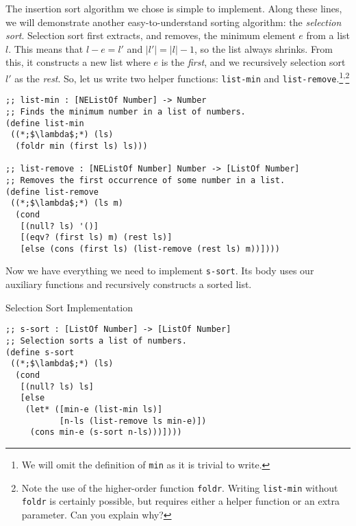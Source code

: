 The insertion sort algorithm we chose is simple to implement. Along these lines, we will demonstrate another easy-to-understand sorting algorithm: the \textit{selection sort}. Selection sort first extracts, and removes, the minimum element $e$ from a list $l$. This means that $l-e=l'$ and $|l'|=|l|-1$, so the list always shrinks. From this, it constructs a new list where $e$ is the \textit{first}, and we recursively selection sort $l'$ as the \textit{rest}. So, let us write two helper functions: \texttt{list-min} and \texttt{list-remove}.\footnote{We will omit the definition of \texttt{min} as it is trivial to write.}\textsuperscript{,}\footnote{Note the use of the higher-order function \texttt{foldr}. Writing \texttt{list-min} without \texttt{foldr} is certainly possible, but requires either a helper function or an extra parameter. Can you explain why?}

\begin{cl}[]{}\begin{lstlisting}[language=MyScheme]
;; list-min : [NEListOf Number] -> Number
;; Finds the minimum number in a list of numbers.
(define list-min
 ((*;$\lambda$;*) (ls)
  (foldr min (first ls) ls)))

;; list-remove : [NEListOf Number] Number -> [ListOf Number]
;; Removes the first occurrence of some number in a list.
(define list-remove
 ((*;$\lambda$;*) (ls m)
  (cond
   [(null? ls) '()]
   [(eqv? (first ls) m) (rest ls)]
   [else (cons (first ls) (list-remove (rest ls) m))])))
\end{lstlisting}\end{cl}

Now we have everything we need to implement \texttt{s-sort}. Its body uses our auxiliary functions and recursively constructs a sorted list.

\begin{cl}[]{Selection Sort Implementation}\begin{lstlisting}[language=MyScheme]
;; s-sort : [ListOf Number] -> [ListOf Number]
;; Selection sorts a list of numbers.
(define s-sort
 ((*;$\lambda$;*) (ls)
  (cond
   [(null? ls) ls]
   [else 
    (let* ([min-e (list-min ls)]
           [n-ls (list-remove ls min-e)])
     (cons min-e (s-sort n-ls)))])))
\end{lstlisting}\end{cl}

